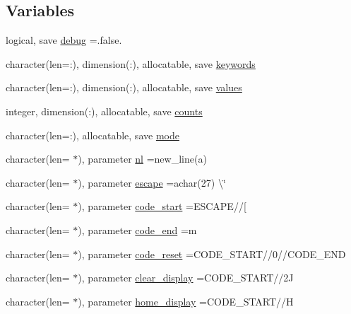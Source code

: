 \subsection*{Variables}
\begin{DoxyCompactItemize}
\item 
logical, save \mbox{\hyperlink{namespacem__escape_af068eb2561159352a9a406c95157b131}{debug}} =.false.
\item 
character(len=\+:), dimension(\+:), allocatable, save \mbox{\hyperlink{namespacem__escape_a35e957e007844dbfe641b3d915fba048}{keywords}}
\item 
character(len=\+:), dimension(\+:), allocatable, save \mbox{\hyperlink{namespacem__escape_a4c3b430bde66148e6f2c79c5418384fa}{values}}
\item 
integer, dimension(\+:), allocatable, save \mbox{\hyperlink{namespacem__escape_a7e8e011813de1e58d7c8bcda489d8f1c}{counts}}
\item 
character(len=\+:), allocatable, save \mbox{\hyperlink{namespacem__escape_ab4e7fcb41457772a9bd4e4413d5355d6}{mode}}
\item 
character(len= $\ast$), parameter \mbox{\hyperlink{namespacem__escape_aa17be0f87e5ec9012a38c04bfbb5e588}{nl}} =new\+\_\+line(\textquotesingle{}a\textquotesingle{})
\item 
character(len= $\ast$), parameter \mbox{\hyperlink{namespacem__escape_a9931f535eb0f6f24df5a121331faa5ef}{escape}} =achar(27) \textbackslash{}\char`\"{}
\item 
character(len= $\ast$), parameter \mbox{\hyperlink{namespacem__escape_a6d5af6b1571cba22511523c53c71fa6f}{code\+\_\+start}} =E\+S\+C\+A\+PE//\textquotesingle{}\mbox{[}\textquotesingle{}
\item 
character(len= $\ast$), parameter \mbox{\hyperlink{namespacem__escape_af913c326395b9bf2c089c30698d2c742}{code\+\_\+end}} =\textquotesingle{}m\textquotesingle{}
\item 
character(len= $\ast$), parameter \mbox{\hyperlink{namespacem__escape_aaaf7224f2104dcd571cdaa69b61b9d01}{code\+\_\+reset}} =C\+O\+D\+E\+\_\+\+S\+T\+A\+RT//\textquotesingle{}0\textquotesingle{}//C\+O\+D\+E\+\_\+\+E\+ND
\item 
character(len= $\ast$), parameter \mbox{\hyperlink{namespacem__escape_a9d45e30ea5891b89dc9a61ba1b5dbc03}{clear\+\_\+display}} =C\+O\+D\+E\+\_\+\+S\+T\+A\+RT//\textquotesingle{}2\+J\textquotesingle{}
\item 
character(len= $\ast$), parameter \mbox{\hyperlink{namespacem__escape_ae4634ac062742627f215df29998fc677}{home\+\_\+display}} =C\+O\+D\+E\+\_\+\+S\+T\+A\+RT//\textquotesingle{}H\textquotesingle{}

\end{DoxyCompactItemize}
